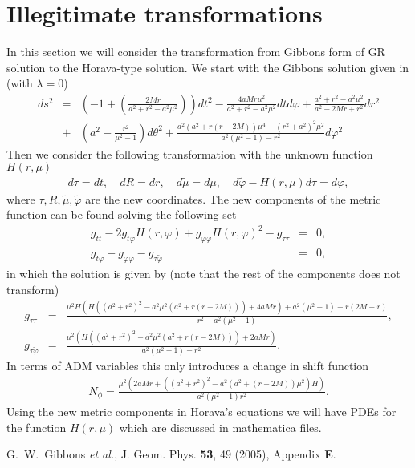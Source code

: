 \documentclass[preprint,aps,tightenlines,showkeys,nofootinbib,superscriptaddress,graphicx]{revtex4}
\begin{document}
\section{Illegitimate transformations}
In this section we will consider the transformation from Gibbons form of GR solution to the Horava-type solution. We start with the Gibbons solution given in \cite{Gibb:2004} (with $\lambda = 0$) 
\begin{eqnarray}
  ds^{2} &= & \left(  -1+\left(\frac{2Mr}{a^{2}+r^{2}-a^{2}\mu ^{2}     }\right)\right)dt^2
  -\frac{4aMr \mu^{2}}{a^{2}+r^{2}-a^2 \mu^2   }dt d \varphi+\frac{a^{2}+r^{2}-a^{2}\mu ^{2}    }{a^{2}-2Mr+r^{2}  }dr^2 \nonumber\\
           & +& \left(a^{2} - \frac{r^{2}}{\mu ^{2}-1 } \right)d \theta ^{2} 
           +\frac{a^2(a^2+r(r-2M))\mu ^{4}-(r^2+a^2)^2 \mu ^2}{a^2(\mu ^2-1)-r^2 }d \varphi ^2 
\end{eqnarray}
Then we consider the following transformation with the unknown function $H(r,\mu )$
\begin{eqnarray}
  d \tau  = dt,\quad dR=dr,\quad d \tilde \mu  = d \mu, \quad d \tilde \varphi -H(r,\mu )d \tau = d \varphi, 
\end{eqnarray}
where $\tau ,R,\tilde \mu , \tilde \varphi $ are the new coordinates. The new components of the metric
function can be found solving the following set
\begin{eqnarray}
  g_{t t}-2g_{t \varphi }H(r,\varphi )+g_{\varphi \varphi }H(r,\varphi )^{2}-g_{\tau \tau }&=&0,\\
  g_{t \varphi }-g_{\varphi  \varphi }-g_{\tau \tilde \varphi }&=&0,
\end{eqnarray}
in which the solution is given by (note that the rest of the components does not transform)
\begin{eqnarray}
  g_{\tau \tau} &=& \frac{{\mu }^2 H \left(H \left(\left(a^2+r^2\right)^2-a^2 {\mu }^2 \left(a^2+r (r-2 M)\right)\right)+4 a M r\right)+a^2 \left({\mu }^2-1\right)+r (2 M-r)}{r^2-a^2 \left({\mu }^2-1\right)},\\
  g_{\tau \tilde\varphi} &=&\frac{\mu ^2 \left(H \left(\left(a^2+r^2\right)^2-a^2 \mu ^2 \left(a^2+r (r-2 M)\right)\right)+2 a M r\right)}{a^2 \left(\mu ^2-1\right)-r^2}. 
\end{eqnarray}
In terms of ADM variables this only introduces a change in shift function
\begin{eqnarray}
  N_{\phi} = \frac{\mu ^{2}(2aMr+((a^{2}+r^2 )^{2}-a^{2}(a^{2}+(r-2M) )\mu ^{2}   )H) }{a^{2}(\mu^{2}-1 ) r^{2} }.
\end{eqnarray}
Using the new metric components in Horava's equations we will have PDEs for the function $H(r,\mu )$ which are discussed in mathematica files.
\begin{thebibliography}{999}


G.~W.~Gibbons \textit{et al.},
J. Geom. Phys. \textbf{53}, 49
(2005), Appendix {\bf E}.


\end{thebibliography}
\end{document}
